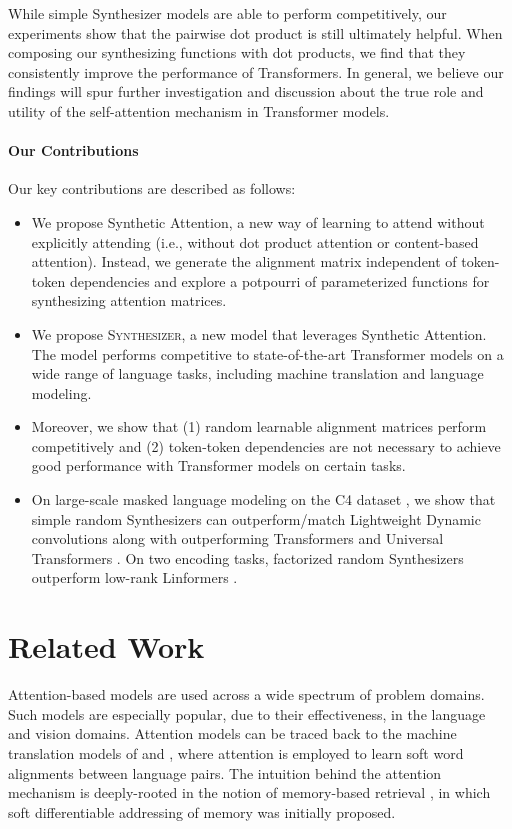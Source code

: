 \documentclass{article} \usepackage{iclr2021_conference,times}
\begin{document}
While simple Synthesizer models are able to perform competitively, our experiments show that the pairwise dot product is still ultimately helpful. When composing our synthesizing functions with dot products, we find that they consistently improve the performance of Transformers. In general, we believe our findings will spur further investigation and discussion about the true role and utility of the self-attention mechanism in Transformer models.



\paragraph{Our Contributions}
Our key contributions are described as follows:
\begin{itemize}
\item We propose Synthetic Attention, a new way of learning to attend without explicitly attending (i.e., without dot product attention or content-based attention). Instead, we generate the alignment matrix independent of token-token dependencies and explore a potpourri of parameterized functions for synthesizing attention matrices. 
\item We propose \textsc{Synthesizer}, a new model that leverages Synthetic Attention. The model performs competitive to state-of-the-art Transformer models on a wide range of language tasks, including machine translation and language modeling. 
\item Moreover, we show that (1) random learnable alignment matrices perform competitively and (2) token-token dependencies are not necessary to achieve good performance with Transformer models on certain tasks. 
\item On large-scale masked language modeling on the C4 dataset \citep{raffel2019exploring}, we show that simple random Synthesizers can outperform/match Lightweight Dynamic convolutions \citep{wu2019pay} along with outperforming Transformers and Universal Transformers \citep{dehghani2018universal}. On two encoding tasks, factorized random Synthesizers outperform low-rank Linformers \citep{wang2020linformer}.
\end{itemize}

\section{Related Work}
Attention-based models are used across a wide spectrum of problem domains. Such models are especially popular, due to their effectiveness, in the language and vision domains. Attention models can be traced back to the machine translation models of \citep{bahdanau2014neural} and \citep{luong2015effective}, where attention is employed to learn soft word alignments between language pairs. The intuition behind the attention mechanism is deeply-rooted in the notion of memory-based retrieval \citep{graves2014neural,weston2014memory}, in which soft differentiable addressing of memory was initially proposed. 
\end{document}
